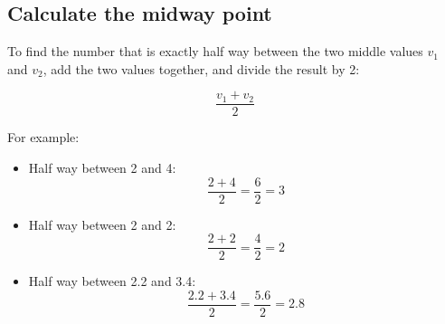 \documentclass[../../../main.tex]{subfiles}
\begin{document}
\begin{center}
\end{center}


\subsection{Calculate the midway point} 

To find the number that is exactly half way between the two middle values $v_{1}$ and $v_{2}$, add the two values together, and divide the result by 2:

\begin{equation*}
  \frac{v_{1} + v_{2}}{2}
\end{equation*}

\noindent
For example:

\begin{itemize}

  \item 
    Half way between 2 and 4:
    \begin{equation*}
      \frac{2 + 4}{2} = \frac{6}{2} = 3
    \end{equation*}
    
  \item 
    Half way between 2 and 2:
    \begin{equation*}
      \frac{2 + 2}{2} = \frac{4}{2} = 2
    \end{equation*} 
    
   \item 
    Half way between 2.2 and 3.4:
    \begin{equation*}
      \frac{2.2 + 3.4}{2} = \frac{5.6}{2} = 2.8
    \end{equation*} 

\end{itemize}
\end{document}
